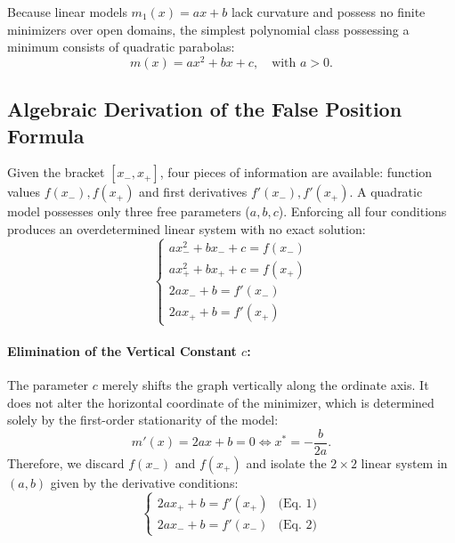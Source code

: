 Because linear models $m_1(x) = ax + b$ lack curvature and possess no finite minimizers over open domains, the simplest polynomial class possessing a minimum consists of quadratic parabolas:
\begin{equation}
    m(x) = a x^2 + b x + c, \quad \text{with } a > 0.
    \label{eq:quadratic-model-parabola-en}
\end{equation}

\subsection{Algebraic Derivation of the False Position Formula}
Given the bracket $[x_-, x_+]$, four pieces of information are available: function values $f(x_-), f(x_+)$ and first derivatives $f'(x_-), f'(x_+)$.
A quadratic model possesses only three free parameters ($a, b, c$). Enforcing all four conditions produces an overdetermined linear system with no exact solution:
\begin{equation}
    \begin{cases}
        a x_-^2 + b x_- + c = f(x_-) \\
        a x_+^2 + b x_+ + c = f(x_+) \\
        2 a x_- + b = f'(x_-) \\
        2 a x_+ + b = f'(x_+)
    \end{cases}
\end{equation}

\paragraph{Elimination of the Vertical Constant $c$:}
The parameter $c$ merely shifts the graph vertically along the ordinate axis. It does not alter the horizontal coordinate of the minimizer, which is determined solely by the first-order stationarity of the model:
\begin{equation}
    m'(x) = 2 a x + b = 0 \iff x^* = -\frac{b}{2a}.
    \label{eq:stationary-point-quadratic-model-en}
\end{equation}
Therefore, we discard $f(x_-)$ and $f(x_+)$ and isolate the $2 \times 2$ linear system in $(a, b)$ given by the derivative conditions:
\begin{equation}
    \begin{cases}
        2 a x_+ + b = f'(x_+) & \text{(Eq.~1)} \\
        2 a x_- + b = f'(x_-) & \text{(Eq.~2)}
    \end{cases}
    \label{eq:linear-system-quadratic-derivatives-en}
\end{equation}

